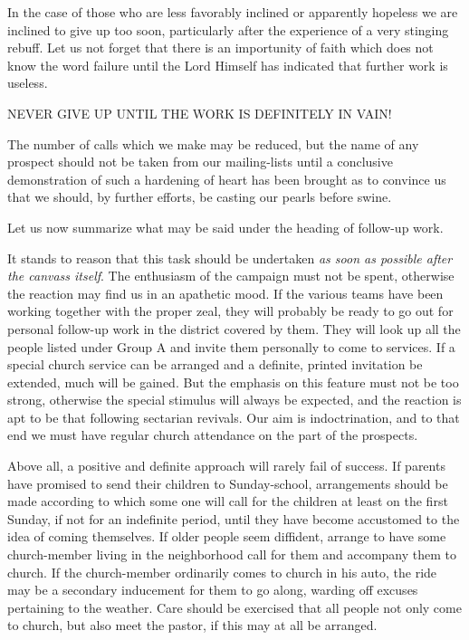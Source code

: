 \documentclass[
]{book}
\begin{document}
In the case of those who are less favorably inclined or apparently hopeless we are inclined to give up too soon, particularly after the experience of a very stinging rebuff. Let us not forget that there is an importunity of faith which does not know the word failure until the Lord Himself has indicated that further work is useless.

NEVER GIVE UP UNTIL THE WORK IS DEFINITELY IN VAIN!

The number of calls which we make may be reduced, but the name of any prospect should not be taken from our mailing-lists until a conclusive demonstration of such a hardening of heart has been brought as to convince us that we should, by further efforts, be casting our pearls before swine.

Let us now summarize what may be said under the heading of follow-up work.

It stands to reason that this task should be undertaken \emph{as soon as possible after the canvass itself}. The enthusiasm of the campaign must not be spent, otherwise the reaction may find us in an apathetic mood. If the various teams have been working together with the proper zeal, they will probably be ready to go out for personal follow-up work in the district covered by them. They will look up all the people listed under Group A and invite them personally to come to services. If a special church service can be arranged and a definite, printed invitation be extended, much will be gained. But the emphasis on this feature must not be too strong, otherwise the special stimulus will always be expected, and the reaction is apt to be that following sectarian revivals. Our aim is indoctrination, and to that end we must have regular church attendance on the part of the prospects.

Above all, a positive and definite approach will rarely fail of success. If parents have promised to send their children to Sunday-school, arrangements should be made according to which some one will call for the children at least on the first Sunday, if not for an indefinite period, until they have become accustomed to the idea of coming themselves. If older people seem diffident, arrange to have some church-member living in the neighborhood call for them and accompany them to church. If the church-member ordinarily comes to church in his auto, the ride may be a secondary inducement for them to go along, warding off excuses pertaining to the weather. Care should be exercised that all people not only come to church, but also meet the pastor, if this may at all be arranged.
\end{document}
